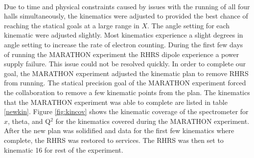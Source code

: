 \paragraph{}Due to time and physical constraints caused by issues with the running of all four halls simultaneously, the kinematics were adjusted to provided the best chance of reaching the statical goals at a large range in $X$. The angle setting for each kinematic were adjusted slightly. Most kinematics experience a slight degrees in angle setting to increase the rate of electron counting. During the first few days of running the MARATHON experiment the RHRS dipole experience a power supply failure. This issue could not be resolved quickly. In order to complete our goal, the MARATHON experiment adjusted the kinematic plan to remove RHRS from running. The statical precision goal of the MARATHON experiment forced the collaboration to remove a few kinematic points from the plan. The kinematics that the MARATHON experiment was able to complete are listed in table \ref{newkin}. Figure \ref{fig:kincov} shows the kinematic coverage of the spectrometer for $x$, theta, and Q$^2$ for the kinematics covered during the MARATHON experiment. After the new plan was solidified and data for the first few kinematics where complete, the RHRS was restored to services. The RHRS was then set to kinematic 16 for rest of the experiment.      

